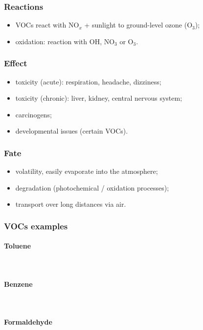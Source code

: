 \documentclass{article}
\newcommand{\pph}[1]{\paragraph{#1}\phantom{}\\}
\begin{document}
\subsubsection{Reactions}
\begin{itemize}
    \item VOCs react with NO$_x$ + sunlight to ground-level ozone (O$_3$);
    \item oxidation: reaction with OH, NO$_3$ or O$_3$.
\end{itemize}

\subsubsection{Effect}
\begin{itemize}
    \item toxicity (acute): respiration, headache, dizziness;
    \item toxicity (chronic): liver, kidney, central nervous system;
    \item carcinogens;
    \item developmental issues (certain VOCs).
\end{itemize}

\subsubsection{Fate}
\begin{itemize}
    \item volatility, easily evaporate into the atmosphere;
    \item degradation (photochemical / oxidation processes);
    \item transport over long distances via air.
\end{itemize}

\subsubsection{VOCs examples}

\pph{Toluene}
\begin{center}
\end{center}

\pph{Benzene}
\begin{center}
\end{center}

\pph{Formaldehyde}
\begin{center}
\end{center}
\end{document}
